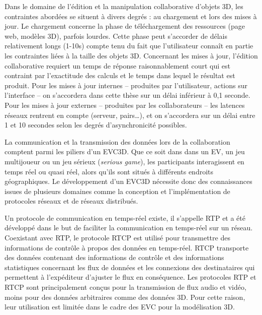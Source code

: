 Dans le domaine de l'édition et la manipulation collaborative 
d'objets 3D, les contraintes abordées se situent à divers degrés : au chargement 
et lors des mises à jour. Le chargement concerne la phase de téléchargement des ressources (page web, modèles 3D), parfois lourdes. Cette phase peut s'accorder de délais 
relativement longs (1-10s) compte tenu du fait que l'utilisateur connaît en partie les 
contraintes liées à la taille des objets 3D. Concernant les mises à jour, l'édition 
collaborative requiert un temps de réponse raisonnablement court qui est contraint par 
l'exactitude des calculs et le temps dans lequel le résultat est produit. Pour les 
mises à jour internes -- produites par l'utilisateur, actions sur l'interface -- on 
s'accordera dans cette thèse sur un délai inférieur à 0,1 seconde. 
Pour les mises à jour externes -- produites par les collaborateurs -- les latences 
réseaux rentrent en compte (serveur, pairs\ldots), et on s'accordera sur un délai 
entre 1 et 10 secondes selon les degrés d'asynchronicité 
possibles. 





La communication et la transmission des données lors de la collaboration comptent parmi les piliers d'un \gls{EVC3D}. Que ce soit dans dans un 
\gls{EV}, un jeu multijoueur ou un jeu sérieux (\textit{serious game}), les 
participants interagissent en temps réel ou quasi réel, alors qu'ils sont situés à 
différents endroits géographiques. 
Le développement d'un \gls{EVC3D} nécessite donc des connaissances issues de 
plusieurs domaines comme la conception et l'implémentation de protocoles 
réseaux et de réseaux distribués.

Un protocole de communication en temps-réel existe, il s'appelle \gls{RTP} et a 
été développé dans le but de faciliter la communication en temps-réel sur un 
réseau. Coexistant avec \gls{RTP}, le protocole \gls{RTCP} est utilisé pour 
transmettre des informations de contrôle à propos des données en temps-réel. 
\gls{RTCP} transporte des données contenant des informations de contrôle et des 
informations statistiques concernant les flux de données et les connexions des 
destinataires qui permettent à l'expéditeur d'ajuster le flux en conséquence. Les 
protocoles \gls{RTP} et \gls{RTCP} sont principalement conçus pour la 
transmission de flux audio et vidéo, moins pour des données arbitraires comme 
des données 3D. Pour cette raison, leur utilisation est limitée dans le cadre des 
\gls{EVC} pour la modélisation 3D. 

